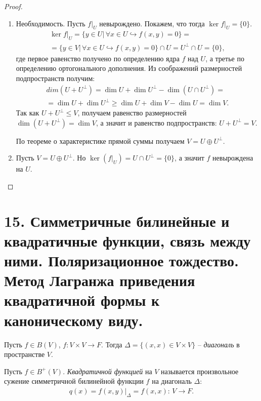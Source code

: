 \begin{proof}~
    \begin{enumerate}
        \item Необходимость. Пусть $f \vert_{U}$ невырождено. Покажем, что тогда 
        $\ker f \vert_{U} = \{0\}$.
        \begin{multline*}
            \ker f \vert_{U} = \{y \in U \vert \, \forall x \in U \hookrightarrow f(x, y) = 0\} = \\
            = \{y \in V \vert \, \forall x \in U \hookrightarrow f(x, y) = 0\} \cap U 
            = U^{\perp} \cap U = \{0\},
        \end{multline*}
        где первое равенство получено по определению ядра $f$ над $U$, а третье по определению 
        ортогонального дополнения. Из соображений размерностей подпространств получим:
        \begin{multline*}
            dim (U + U^{\perp}) = \dim U + \dim U^{\perp} - \dim (U \cap U^{\perp}) = \\ =
            \dim U + \dim U^{\perp} \geq \dim U + \dim V - \dim U = \dim V.
        \end{multline*} 
        Так как $U + U^{\perp} \leq V$, получаем равенство размерностей $\dim (U + U^{\perp}) = \dim V$, 
        а значит и равенство подпространств: $U + U^{\perp} = V$. 
        
        По теореме о характеристике прямой суммы получаем $V = U \oplus U^{\perp}$.

        \item Пусть $V = U \oplus U^{\perp}$. Но $\ker (f \vert_{U}) = U \cap U^{\perp} = \{0\}$, 
        а значит $f$ невырождена на $U$.
    \end{enumerate}
\end{proof}

\section{15. Симметричные билинейные и квадратичные функции, связь между ними. Поляризационное тождество. Метод Лагранжа приведения квадратичной формы к каноническому виду.}

\begin{definition}
    Пусть $f \in B(V)$, $f: V \times V \to F$. Тогда $\Delta = \{(x, x) \in V \times V\}$ -- 
    \textit{диагональ} в пространстве $V$.
\end{definition}

\begin{definition} 
    Пусть $f \in B^{+}(V)$. \textit{Квадратичной функцией} на $V$ называется произвольное сужение симметричной 
    билинейной функции $f$ на диагональ $\Delta$:
    \begin{gather*}
        q(x) = f(x, y) \vert_{\Delta} = f(x, x): \, V \to F.
    \end{gather*} 
\end{definition}


